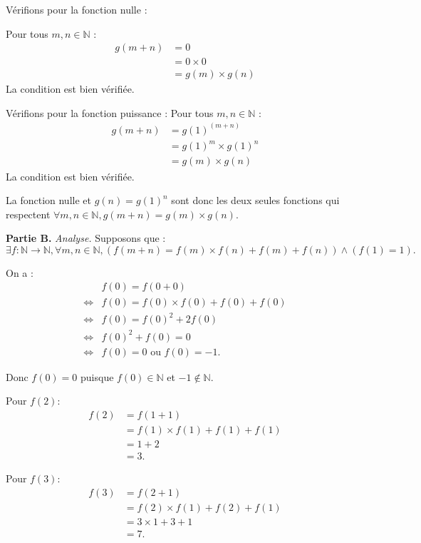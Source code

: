 \documentclass[]{../templates/homework}
\begin{document}
Vérifions pour la fonction nulle :

Pour tous $m, n \in \mathbb{N}$ :
\begin{align*}
	g(m + n) &= 0 \\
	&= 0 \times 0 \\
	&= g(m) \times g(n)
\end{align*}
La condition est bien vérifiée.

Vérifions pour la fonction puissance :
Pour tous $m, n \in \mathbb{N}$ :
\begin{align*}
	g(m + n) &= g(1)^{(m + n)} \\
	&= g(1)^m \times g(1)^n \\
	&= g(m) \times g(n)
\end{align*}
La condition est bien vérifiée.

La fonction nulle et $g(n) = g(1)^n$ sont donc les deux seules fonctions qui respectent $\forall m, n \in \mathbb{N}, g(m + n) = g(m) \times g(n)$.

\textbf{Partie B.}
\textit{Analyse.}
Supposons que :
\begin{equation*}
	\exists f:\mathbb{N} \to \mathbb{N}, \forall m, n \in \mathbb{N}, (f(m+n) = f(m) \times f(n) + f(m) + f(n)) \land (f(1) = 1).
\end{equation*}

\question On a :
\begin{align*}
	&f(0) = f(0+0) \\
	\iff &f(0) = f(0) \times f(0) + f(0) + f(0) \\
	\iff &f(0) = f(0)^2 + 2f(0) \\
	\iff &f(0)^2 + f(0) = 0 \\
	\iff &f(0) = 0 \text{ ou } f(0) = -1.
\end{align*}

Donc $f(0) = 0$ puisque $f(0) \in \mathbb{N}$ et $-1 \notin \mathbb{N}$.

\question Pour $f(2)$:
\begin{align*}
	f(2) &= f(1+1) \\
	&= f(1) \times f(1) + f(1) + f(1) \\
	&= 1 + 2 \\
	&= 3.
\end{align*}

Pour $f(3)$:
\begin{align*}
	f(3) &= f(2+1) \\
	&= f(2) \times f(1) + f(2) + f(1) \\
	&= 3 \times 1 + 3 + 1 \\
	&= 7.
\end{align*}
\end{document}
